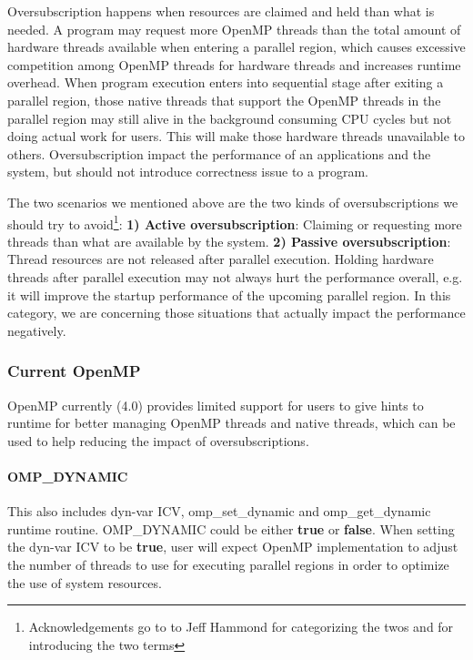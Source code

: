Oversubscription happens when resources are claimed and held than what is needed.
A program may request more OpenMP threads than the total amount of hardware
threads available when entering a parallel region, which causes excessive competition 
among OpenMP threads for hardware threads and increases runtime overhead. 
When program execution enters into sequential stage after exiting a parallel region, 
those native threads that support the OpenMP threads in the parallel region may still 
alive in the background consuming CPU cycles but not doing actual work for users. This 
will make those hardware threads unavailable to others. 
Oversubscription impact the performance of an applications and the system, 
but should not introduce correctness issue to a program. 


The two scenarios we mentioned above are the two kinds of oversubscriptions we should try to avoid\footnote{Acknowledgements go to to Jeff Hammond for categorizing the twos and for introducing the two terms}:  
{\bf 1) Active oversubscription}: Claiming or requesting more threads than 
what are available by the system.
{\bf 2) Passive oversubscription}: Thread resources are not released 
after parallel execution. Holding hardware threads after parallel execution may not 
always hurt the performance overall, e.g. it will improve the startup performance of the 
upcoming parallel region. In this category, we are concerning those situations that 
actually impact the performance negatively.

\subsubsection{Current OpenMP}
OpenMP currently (4.0) provides limited support for users to give hints to runtime for
better managing OpenMP threads and native threads, which can be used to help reducing 
the impact of oversubscriptions.
\paragraph{OMP\_DYNAMIC} %
This also includes dyn-var ICV, omp\_set\_dynamic and omp\_get\_dynamic runtime routine. OMP\_DYNAMIC could be either
{\bf true} or {\bf false}. When setting the dyn-var ICV to be {\bf true}, user will expect
OpenMP implementation to adjust the number of threads to use for executing parallel
regions in order to optimize the use of system resources.

